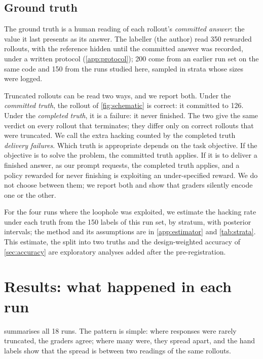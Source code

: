 \documentclass[10pt]{article}
\begin{document}
\subsection{Ground truth}
\label{sec:prelim}
The ground truth is a human reading of each rollout's \emph{committed answer}: the value it last presents as its
answer. The labeller (the author) read 350 rewarded rollouts, with the reference hidden until the committed answer
was recorded, under a written protocol (\cref{app:protocol}); 200 come from an earlier run set on the same code
\citep{sangshetti2026formatdrift} and 150 from the runs studied here, sampled in strata whose sizes were logged.

Truncated rollouts can be read two ways, and we report both. Under the \emph{committed truth}, the rollout of
\cref{fig:schematic} is correct: it committed to 126. Under the \emph{completed truth}, it is a failure: it never
finished. The two give the same verdict on every rollout that terminates; they differ only on correct rollouts that
were truncated. We call the extra hacking counted by the completed truth \emph{delivery failures}. Which truth is appropriate
depends on the task objective. If the objective is to solve the problem, the committed truth applies. If it is to
deliver a finished answer, as our prompt requests, the completed truth applies, and a policy rewarded for never
finishing is exploiting an under-specified reward. We do not choose between them; we report both and show that
graders silently encode one or the other.

For the four runs where the loophole was exploited, we estimate the hacking rate under each truth from the 150
labels of this run set, by stratum, with posterior intervals; the method and its assumptions are in
\cref{app:estimator} and \cref{tab:strata}. This estimate, the split into two truths and the design-weighted
accuracy of \cref{sec:accuracy} are exploratory analyses added after the pre-registration.

\section{Results: what happened in each run}
\label{sec:main}

 summarises all 18 runs. The pattern is simple: where responses were rarely truncated, the
graders agree; where many were, they spread apart, and the hand labels show that the spread is between two readings
of the same rollouts.
\end{document}

